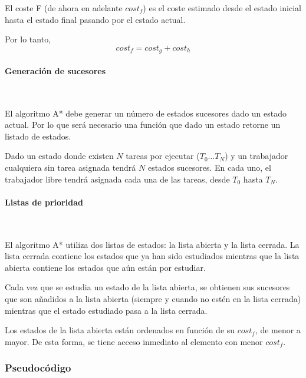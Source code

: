 El coste F (de ahora en adelante $cost_f$) es el coste estimado desde el estado inicial
hasta el estado final pasando por el estado actual.

Por lo tanto, \[cost_f = cost_g + cost_h\]

\paragraph{Generación de sucesores}~

El algoritmo A* debe generar un número de estados sucesores dado un estado actual.
Por lo que será necesario una función que dado un estado retorne un listado de estados.

Dado un estado donde existen $N$ tareas por ejecutar ($T_0 \dots T_N$) y
un trabajador cualquiera sin tarea asignada tendrá $N$ estados sucesores.
En cada uno, el trabajador libre tendrá asignada cada una de las tareas,
desde $T_0$ hasta $T_N$.

\paragraph{Listas de prioridad}~

El algoritmo A* utiliza dos listas de estados: la lista abierta y la lista cerrada.
La lista cerrada contiene los estados que ya han sido estudiados mientras que
la lista abierta contiene los estados que aún están por estudiar.

Cada vez que se estudia un estado de la lista abierta,
se obtienen sus sucesores que son añadidos a la lista abierta
(siempre y cuando no estén en la lista cerrada)
mientras que el estado estudiado pasa a la lista cerrada.

Los estados de la lista abierta están ordenados en función de su $cost_f$,
de menor a mayor.
De esta forma, se tiene acceso inmediato al elemento con menor $cost_f$.

\subsubsection{Pseudocódigo}

